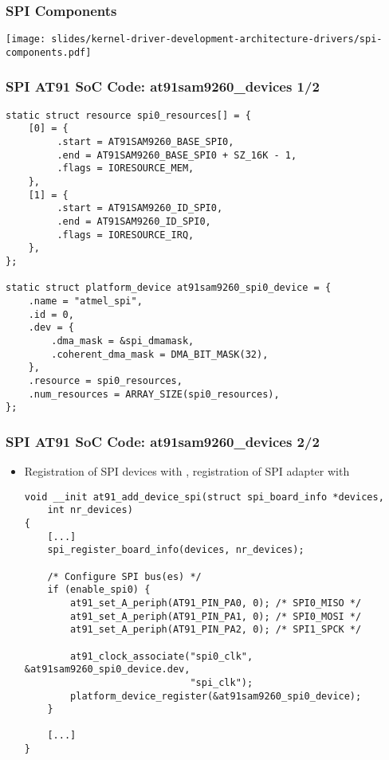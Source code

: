 \begin{frame}
  \frametitle{SPI Components}
  \begin{center}
    \texttt{[image: slides/kernel-driver-development-architecture-drivers/spi-components.pdf]}
  \end{center}
\end{frame}

\begin{frame}[fragile]
  \frametitle{SPI AT91 SoC Code: at91sam9260\_devices 1/2}
  \begin{verbatim}
static struct resource spi0_resources[] = {
    [0] = {
         .start = AT91SAM9260_BASE_SPI0,
         .end = AT91SAM9260_BASE_SPI0 + SZ_16K - 1,
         .flags = IORESOURCE_MEM,
    },
    [1] = {
         .start = AT91SAM9260_ID_SPI0,
         .end = AT91SAM9260_ID_SPI0,
         .flags = IORESOURCE_IRQ,
    },
};

static struct platform_device at91sam9260_spi0_device = {
    .name = "atmel_spi",
    .id = 0,
    .dev = {
        .dma_mask = &spi_dmamask,
        .coherent_dma_mask = DMA_BIT_MASK(32),
    },
    .resource = spi0_resources,
    .num_resources = ARRAY_SIZE(spi0_resources),
};
  \end{verbatim}
\end{frame}

\begin{frame}[fragile]
  \frametitle{SPI AT91 SoC Code: at91sam9260\_devices 2/2}
  \begin{itemize}
  \item Registration of SPI devices with
    , registration of SPI adapter with
  \begin{verbatim}
void __init at91_add_device_spi(struct spi_board_info *devices,
    int nr_devices)
{
    [...]
    spi_register_board_info(devices, nr_devices);

    /* Configure SPI bus(es) */
    if (enable_spi0) {
        at91_set_A_periph(AT91_PIN_PA0, 0); /* SPI0_MISO */
        at91_set_A_periph(AT91_PIN_PA1, 0); /* SPI0_MOSI */
        at91_set_A_periph(AT91_PIN_PA2, 0); /* SPI1_SPCK */

        at91_clock_associate("spi0_clk", &at91sam9260_spi0_device.dev,
                             "spi_clk");
        platform_device_register(&at91sam9260_spi0_device);
    }

    [...]
}
  \end{verbatim}
  \end{itemize}
\end{frame}

